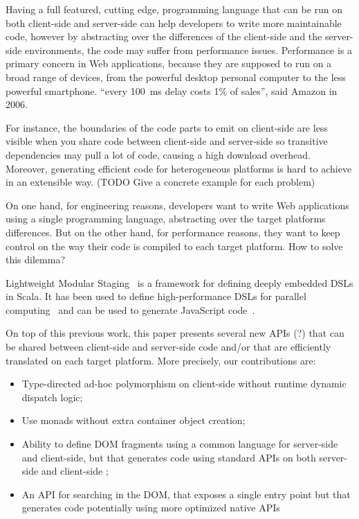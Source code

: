 \documentclass[preprint]{sigplanconf}
\begin{document}
Having a full featured, cutting edge, programming language that can be run on both client-side and server-side can
help developers to write more maintainable code, however by abstracting over the differences of the client-side and
the server-side environments, the code may suffer from performance issues. Performance is a primary concern in Web
applications, because they are supposed to run on a broad range of devices, from the powerful desktop personal
computer to the less powerful smartphone. “every 100~ms delay costs 1\% of sales”, said Amazon in 2006.

For instance, the boundaries of the code parts to emit on client-side are less visible when you share code between
client-side and server-side so transitive dependencies may pull a lot of code, causing a high download overhead.
Moreover, generating efficient code for heterogeneous platforms is hard to achieve in an extensible way. (TODO Give a
concrete example for each problem)

On one hand, for engineering reasons, developers want to write Web applications using a single programming language,
abstracting over the target platforms differences. But on the other hand, for performance reasons, they want to keep
control on the way their code is compiled to each target platform. How to solve this dilemma?

Lightweight Modular Staging~\cite{Rompf12_LMSThesis} is a framework for defining deeply embedded DSLs in Scala. It
has been used to define high-performance DSLs for parallel computing~\cite{Brown11_Parallel} and can be used to
generate JavaScript code~\cite{Kossakowski12_JsDESL}.

On top of this previous work, this paper presents several new APIs (?) that can be shared between client-side and
server-side code and/or that are efficiently translated on each target platform. More precisely, our contributions
are:

\begin{itemize}
 \item Type-directed ad-hoc polymorphism on client-side without runtime dynamic dispatch logic;
 \item Use monads without extra container object creation;
 \item Ability to define DOM fragments using a common language for server-side and client-side, but that generates
code using standard APIs on both server-side and client-side ;
 \item An API for searching in the DOM, that exposes a single entry point but that generates code potentially using
more optimized native APIs
\end{itemize}
\end{document}
